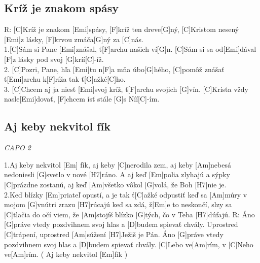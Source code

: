 \documentclass[10pt]{article}
\begin{document}
\begin{Large}
\begin{minipage}{\textwidth}
\subsection{Kríž je znakom spásy}
\begin{multicols}{2}
\begin{guitar}
	R: [C]Kríž je znakom [Emi]spásy, 
	[F]kríž ten dreve[G]ný,
	[C]Kristom nesený [Emi]z lásky, 
	[F]krvou zmáča[G]ný za [C]nás.
	\\
	1.[C]Sám si Pane [Emi]znášal, 
	ť[F]archu našich ví[G]n.
	[C]Sám si sa od[Emi]dával 
	[F]z lásky pod svoj [G]kríí[C]-íž.
	\\
	2. [C]Pozri, Pane, hľa [Emi]tu 
	n[F]a mňa úbo[G]hého,
	[C]pomôž znášať ť[Emi]archu 
	k[F]ríža tak ť[G]ažké[C]ho.
	\\
	3. [C]Chcem aj ja niesť [Emi]svoj kríž,
	ť[F]archu svojich [G]vín.
	[C]Krista vždy nasle[Emi]dovať, 
	[F]chcem ísť stále [G]s Níí[C]-ím.
\end{guitar}
\end{multicols}
\end{minipage}

\begin{minipage}{\textwidth}
\subsection{Aj keby nekvitol fík}
\textit{CAPO 2}
\begin{multicols*}{2}
\begin{guitar}	
	1.Aj keby nekvitol [Em] fík,
	aj keby [C]nerodila zem,
	aj keby [Am]nebesá nedoniesli [G]svetlo v nové [H7]ráno.
	A aj keď [Em]polia zlyhajú
	a sýpky [C]prázdne zostanú,
	aj keď [Am]všetko vôkol [G]volá, že Boh [H7]nie je.
	\\
	2.Keď blízky [Em]priateľ opustí,
	a je tak ť[C]ažké odpustiť
	keď sa [Am]múry v mojom [G]vnútri zrazu [H7]rúcajú
	keď sa zdá, ž[Em]e to neskončí,
	slzy sa [C]tlačia do očí
	viem, že [Am]stojíš blízko [G]tých, čo v Teba [H7]dúfajú.
	\columnbreak
	R: 
	Áno [G]práve vtedy pozdvihnem svoj hlas
	a [D]budem spievať chvály.
	Uprostred [C]trápení, uprostred [Am]súžení 
	[H7]Ježiš je Pán.
	Áno [G]práve vtedy pozdvihnem svoj hlas
	a [D]budem spievať chvály.
	[C]Lebo ve[Am]rím, v [C]Neho ve[Am]rím.
	( Aj keby nekvitol [Em]fík )
\end{guitar}
\end{multicols*}
\end{minipage}

\begin{minipage}{\textwidth}

\end{minipage}
\end{Large}
\end{document}
